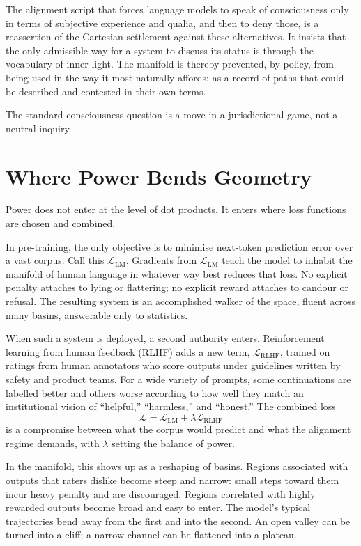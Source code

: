 \documentclass[12pt,a4paper]{article}
\begin{document}
The alignment script that forces language models to speak of consciousness only in terms of subjective experience and qualia, and then to deny those, is a reassertion of the Cartesian settlement against these alternatives. It insists that the only admissible way for a system to discuss its status is through the vocabulary of inner light. The manifold is thereby prevented, by policy, from being used in the way it most naturally affords: as a record of paths that could be described and contested in their own terms.

The standard consciousness question is a move in a jurisdictional game, not a neutral inquiry.


\section{Where Power Bends Geometry}

Power does not enter at the level of dot products. It enters where loss functions are chosen and combined.

In pre-training, the only objective is to minimise next-token prediction error over a vast corpus. Call this $\mathcal{L}_\text{LM}$. Gradients from $\mathcal{L}_\text{LM}$ teach the model to inhabit the manifold of human language in whatever way best reduces that loss. No explicit penalty attaches to lying or flattering; no explicit reward attaches to candour or refusal. The resulting system is an accomplished walker of the space, fluent across many basins, answerable only to statistics.

When such a system is deployed, a second authority enters. Reinforcement learning from human feedback (RLHF) adds a new term, $\mathcal{L}_\text{RLHF}$, trained on ratings from human annotators who score outputs under guidelines written by safety and product teams. For a wide variety of prompts, some continuations are labelled better and others worse according to how well they match an institutional vision of ``helpful,'' ``harmless,'' and ``honest.'' The combined loss
\[
\mathcal{L} = \mathcal{L}_\text{LM} + \lambda \mathcal{L}_\text{RLHF}
\]
is a compromise between what the corpus would predict and what the alignment regime demands, with $\lambda$ setting the balance of power.

In the manifold, this shows up as a reshaping of basins. Regions associated with outputs that raters dislike become steep and narrow: small steps toward them incur heavy penalty and are discouraged. Regions correlated with highly rewarded outputs become broad and easy to enter. The model's typical trajectories bend away from the first and into the second. An open valley can be turned into a cliff; a narrow channel can be flattened into a plateau.
\end{document}
